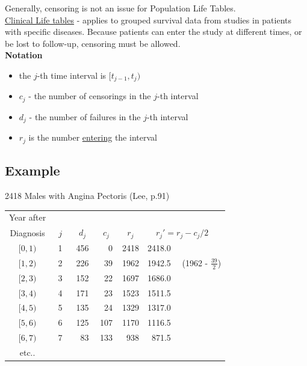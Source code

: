 \documentclass[11pt,slidesonly,semrot,portrait,palatino]{book}
\begin{document}
Generally, censoring is not an issue for Population Life Tables.
\\[2ex]
\underline{\sc Clinical Life tables} - applies to grouped
survival data from studies in patients with specific diseases.
Because patients can enter the study at different times,
or be lost to follow-up, censoring must be allowed.
\\[2ex]
{\bf Notation}
\begin{itemize}
\item  the  $j$-th time interval is $[t_{j-1},t_j)$
\item  $c_j$ - the number of censorings in the $j$-th interval
\item  $d_j$ - the number of failures in the $j$-th interval
\item  $r_j$ is the number \underline{entering} the interval\\
\end{itemize}
\subsection{Example}
2418 Males with Angina Pectoris (Lee, p.91)\\[2ex]

\begin{center}
\begin{tabular}{cccccl}
Year after\\
Diagnosis & ~$j$~ & ~$d_j$~ & ~$c_j$~ & ~$r_j$~
& ~~$r_j'=r_j-c_j/2$~~\\ \hline
$[0,1)$ &1 & 456  & ~~0 & 2418 & 2418.0\\
$[1,2)$ &2 & 226  & ~39 & 1962 & 1942.5 ~~(1962 - $\frac{39}{2}$) \\
$[2,3)$ &3 & 152  & ~22 & 1697 & 1686.0  \\
$[3,4)$ &4 & 171  & ~23 & 1523 & 1511.5  \\
$[4,5)$ &5 & 135  & ~24 & 1329 & 1317.0  \\
$[5,6)$ &6 & 125  & 107 & 1170 & 1116.5  \\
$[6,7)$ &7 & ~83  & 133 & ~938 & ~871.5 \\
etc..
\end{tabular}
\end{center}
\end{document}
